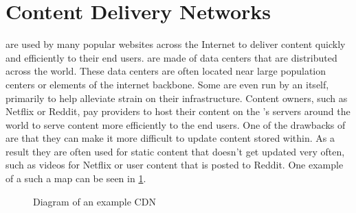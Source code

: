 \section{Content Delivery Networks}\label{sec:background_cdns}
\CDNs are used by many popular websites across the Internet to deliver content quickly and efficiently to their end users. \CDNs are made of data centers that are distributed across the world. These data centers are often located near large population centers or elements of the internet backbone. Some \cdns are even run by an \isp itself, primarily to help alleviate strain on their infrastructure. Content owners, such as Netflix or Reddit, pay \cdn providers to host their content on the \cdn's servers around the world to serve content more efficiently to the end users. One of the drawbacks of \cdns are that they can make it more difficult to update content stored within. As a result they are often used for static content that doesn't get updated very often, such as videos for Netflix or user content that is posted to Reddit. One example of a such a map can be seen in \cref{fig:example_cdn}.

\begin{figure}[h]
    \centering
    \caption{Diagram of an example CDN}
    \label{fig:example_cdn}
\end{figure}